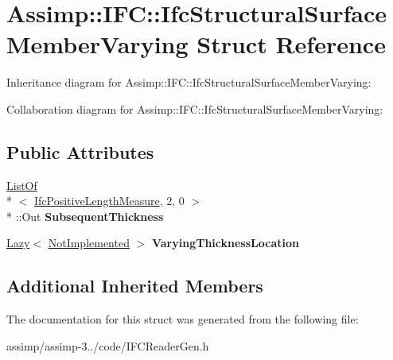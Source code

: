 \hypertarget{struct_assimp_1_1_i_f_c_1_1_ifc_structural_surface_member_varying}{\section{Assimp\+:\+:I\+F\+C\+:\+:Ifc\+Structural\+Surface\+Member\+Varying Struct Reference}
\label{struct_assimp_1_1_i_f_c_1_1_ifc_structural_surface_member_varying}
}


Inheritance diagram for Assimp\+:\+:I\+F\+C\+:\+:Ifc\+Structural\+Surface\+Member\+Varying\+:


Collaboration diagram for Assimp\+:\+:I\+F\+C\+:\+:Ifc\+Structural\+Surface\+Member\+Varying\+:
\subsection*{Public Attributes}
\begin{DoxyCompactItemize}
\item 
\hypertarget{struct_assimp_1_1_i_f_c_1_1_ifc_structural_surface_member_varying_aa6cc9e5727cd3bea0260fcb0f8ff6b50}{\hyperlink{struct_assimp_1_1_s_t_e_p_1_1_list_of}{List\+Of}\\*
$<$ \hyperlink{class_assimp_1_1_s_t_e_p_1_1_e_x_p_r_e_s_s_1_1_primitive_data_type}{Ifc\+Positive\+Length\+Measure}, 2, 0 $>$\\*
\+::Out {\bfseries Subsequent\+Thickness}}\label{struct_assimp_1_1_i_f_c_1_1_ifc_structural_surface_member_varying_aa6cc9e5727cd3bea0260fcb0f8ff6b50}

\item 
\hypertarget{struct_assimp_1_1_i_f_c_1_1_ifc_structural_surface_member_varying_a52615b49a7a1106ed75ecdbf24a1f23a}{\hyperlink{struct_assimp_1_1_s_t_e_p_1_1_lazy}{Lazy}$<$ \hyperlink{struct_assimp_1_1_i_f_c_1_1_not_implemented}{Not\+Implemented} $>$ {\bfseries Varying\+Thickness\+Location}}\label{struct_assimp_1_1_i_f_c_1_1_ifc_structural_surface_member_varying_a52615b49a7a1106ed75ecdbf24a1f23a}

\end{DoxyCompactItemize}
\subsection*{Additional Inherited Members}


The documentation for this struct was generated from the following file\+:\begin{DoxyCompactItemize}
\item 
assimp/assimp-\/3../code/I\+F\+C\+Reader\+Gen.\+h\end{DoxyCompactItemize}
